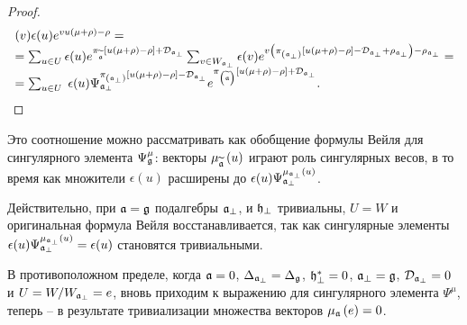 \begin{proof}
\begin{equation}
\begin{array}{l}
(v)\epsilon (u)e^{vu(\mu +\rho )-\rho }= \\
=\sum_{u\in U}\epsilon (u)e^{\pi _{\aft}\left[ u(\mu +\rho )-\rho \right]
+\mathcal{D}_{\frak{a}_{\perp }}}\sum_{v\in W_{\frak{a}_{\perp }}}\epsilon
(v)e^{v\left( \pi _{\left( \frak{a}_{\perp }\right) }\left[
u(\mu +\rho )-\rho \right] -\mathcal{D}_{\frak{a}_{\perp }}+\rho _{\frak{a}%
_{\perp }}\right) -\rho _{\frak{a}_{\perp }}}= \\
=\sum_{u\in U}\;\epsilon (u)\Psi _{\af_{\perp }}^{\pi
_{\left( \frak{a}_{\perp }\right) }\left[ u(\mu +\rho )-\rho
\right] -\mathcal{D}_{\frak{a}_{\perp }}}e^{\pi _{\left( \aft\right) }%
\left[ u(\mu +\rho )-\rho \right] +\mathcal{D}_{\frak{a}_{\perp }}}.
\end{array}
\label{singular main}
\end{equation}
\end{proof}


\begin{remark}
Это соотношение можно рассматривать как обобщение формулы Вейля для сингулярного элемента $\Psi _{\frak{g}}^{\mu }$: векторы $\mu _{%
\widetilde{\mathfrak{a}}}\left( u\right) $ играют роль сингулярных весов, в то время как множители  $\epsilon (u)$ расширены до $\epsilon
(u)\Psi _{\frak{a}_{\perp }}^{\mu _{\frak{a}_{\perp }}\left( u\right) }$.

Действительно, при  $\frak{a=g}$ подалгебры  $\frak{a}_{\perp }$, и $\frak{h}_{\perp }$ тривиальны, $U=W$ и оригинальная формула Вейля восстанавливается, так как сингулярные элементы $\epsilon (u)\Psi _{\frak{a}_{\perp %
}}^{\mu _{\frak{a}_{\perp }}\left( u\right) }=\epsilon (u)$ становятся  тривиальными.

В противоположном пределе, когда $\frak{a}=0$, $\Delta _{\frak{a}_{\perp }}=\Delta _{\frak{g}}$, $%
\frak{h}_{\perp }^{\ast }=0$, $\frak{a}_{\perp }=\frak{g}$, $\mathcal{D}_{%
\frak{a}_{\perp }}=0$ и $U=W/W_{\frak{a}_{\perp }}=e$, вновь приходим к выражению для  сингулярного элемента
 $\Psi ^{\mu }$, теперь -- в результате тривиализации множества векторов $\mu _{\mathfrak{a}}\left( e\right) =0$.
\end{remark}

